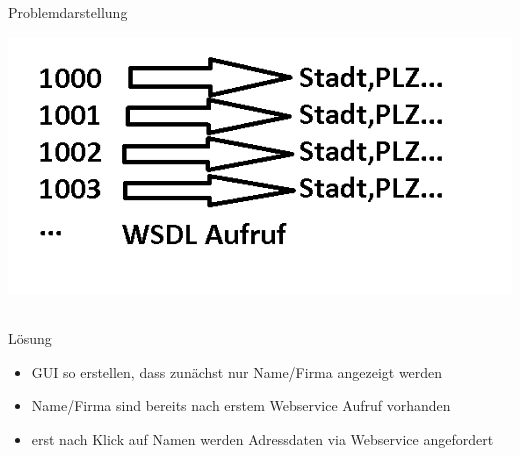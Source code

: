 \documentclass[xcolor={usenames,dvipsnames}, compress, 10pt]{beamer}
\begin{document}
\subsection*{}

\begin{frame}{Problemdarstellung}
\begin{center}

\includegraphics[width=\textheight]{Bilder/presi1.png} 

\end{center}
\end{frame}

\subsection*{}

\begin{frame}{Lösung}
\begin{center}

\begin{itemize}
\item GUI so erstellen, dass zunächst nur Name/Firma angezeigt werden
\item Name/Firma sind bereits nach erstem Webservice Aufruf vorhanden
\item erst nach Klick auf Namen werden Adressdaten via Webservice angefordert
\end{itemize}

\end{center}
\end{frame}

\subsection*{}
\end{document}
